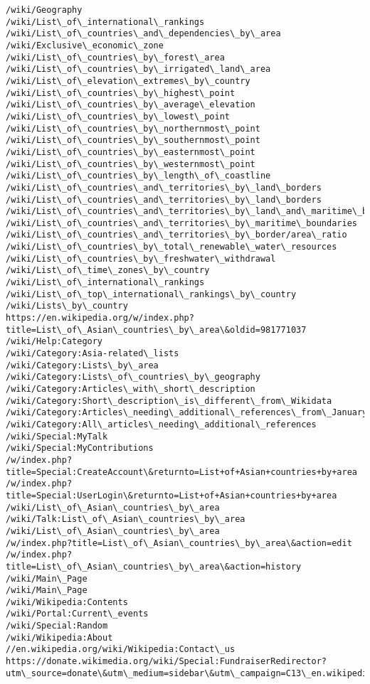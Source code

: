 \documentclass[11pt]{article}
\begin{document}
\begin{Verbatim}[commandchars=\\\{\}]
/wiki/Geography
/wiki/List\_of\_international\_rankings
/wiki/List\_of\_countries\_and\_dependencies\_by\_area
/wiki/Exclusive\_economic\_zone
/wiki/List\_of\_countries\_by\_forest\_area
/wiki/List\_of\_countries\_by\_irrigated\_land\_area
/wiki/List\_of\_elevation\_extremes\_by\_country
/wiki/List\_of\_countries\_by\_highest\_point
/wiki/List\_of\_countries\_by\_average\_elevation
/wiki/List\_of\_countries\_by\_lowest\_point
/wiki/List\_of\_countries\_by\_northernmost\_point
/wiki/List\_of\_countries\_by\_southernmost\_point
/wiki/List\_of\_countries\_by\_easternmost\_point
/wiki/List\_of\_countries\_by\_westernmost\_point
/wiki/List\_of\_countries\_by\_length\_of\_coastline
/wiki/List\_of\_countries\_and\_territories\_by\_land\_borders
/wiki/List\_of\_countries\_and\_territories\_by\_land\_borders
/wiki/List\_of\_countries\_and\_territories\_by\_land\_and\_maritime\_borders
/wiki/List\_of\_countries\_and\_territories\_by\_maritime\_boundaries
/wiki/List\_of\_countries\_and\_territories\_by\_border/area\_ratio
/wiki/List\_of\_countries\_by\_total\_renewable\_water\_resources
/wiki/List\_of\_countries\_by\_freshwater\_withdrawal
/wiki/List\_of\_time\_zones\_by\_country
/wiki/List\_of\_international\_rankings
/wiki/List\_of\_top\_international\_rankings\_by\_country
/wiki/Lists\_by\_country
https://en.wikipedia.org/w/index.php?title=List\_of\_Asian\_countries\_by\_area\&oldid=981771037
/wiki/Help:Category
/wiki/Category:Asia-related\_lists
/wiki/Category:Lists\_by\_area
/wiki/Category:Lists\_of\_countries\_by\_geography
/wiki/Category:Articles\_with\_short\_description
/wiki/Category:Short\_description\_is\_different\_from\_Wikidata
/wiki/Category:Articles\_needing\_additional\_references\_from\_January\_2017
/wiki/Category:All\_articles\_needing\_additional\_references
/wiki/Special:MyTalk
/wiki/Special:MyContributions
/w/index.php?title=Special:CreateAccount\&returnto=List+of+Asian+countries+by+area
/w/index.php?title=Special:UserLogin\&returnto=List+of+Asian+countries+by+area
/wiki/List\_of\_Asian\_countries\_by\_area
/wiki/Talk:List\_of\_Asian\_countries\_by\_area
/wiki/List\_of\_Asian\_countries\_by\_area
/w/index.php?title=List\_of\_Asian\_countries\_by\_area\&action=edit
/w/index.php?title=List\_of\_Asian\_countries\_by\_area\&action=history
/wiki/Main\_Page
/wiki/Main\_Page
/wiki/Wikipedia:Contents
/wiki/Portal:Current\_events
/wiki/Special:Random
/wiki/Wikipedia:About
//en.wikipedia.org/wiki/Wikipedia:Contact\_us
https://donate.wikimedia.org/wiki/Special:FundraiserRedirector?utm\_source=donate\&utm\_medium=sidebar\&utm\_campaign=C13\_en.wikipedia.org\&uselang=en

\end{Verbatim}
\end{document}
